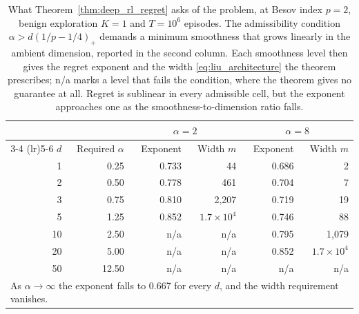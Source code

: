 \begin{table}[htbp]
\centering
\caption{What Theorem~\ref{thm:deep_rl_regret} asks of the problem, at Besov index $p = 2$, benign exploration $K = 1$ and $T = 10^{6}$ episodes. The admissibility condition $\alpha > d(1/p - 1/4)_+$ demands a minimum smoothness that grows linearly in the ambient dimension, reported in the second column. Each smoothness level then gives the regret exponent and the width \eqref{eq:liu_architecture} the theorem prescribes; n/a marks a level that fails the condition, where the theorem gives no guarantee at all. Regret is sublinear in every admissible cell, but the exponent approaches one as the smoothness-to-dimension ratio falls.}
\label{tab:curse_smoothness}
\begin{tabular}{rrrrrr}
\toprule
 & & \multicolumn{2}{c}{$\alpha = 2$} & \multicolumn{2}{c}{$\alpha = 8$} \\
\cmidrule(lr){3-4} \cmidrule(lr){5-6}
$d$ & Required $\alpha$ & Exponent & Width $m$ & Exponent & Width $m$ \\
\midrule
1 & 0.25 & 0.733 & 44 & 0.686 & 2 \\
2 & 0.50 & 0.778 & 461 & 0.704 & 7 \\
3 & 0.75 & 0.810 & 2,207 & 0.719 & 19 \\
5 & 1.25 & 0.852 & $1.7 \times 10^{4}$ & 0.746 & 88 \\
10 & 2.50 & n/a & n/a & 0.795 & 1,079 \\
20 & 5.00 & n/a & n/a & 0.852 & $1.7 \times 10^{4}$ \\
50 & 12.50 & n/a & n/a & n/a & n/a \\
\midrule
\multicolumn{6}{l}{As $\alpha \to \infty$ the exponent falls to 0.667 for every $d$, and the width requirement vanishes.} \\
\bottomrule
\end{tabular}
\end{table}
